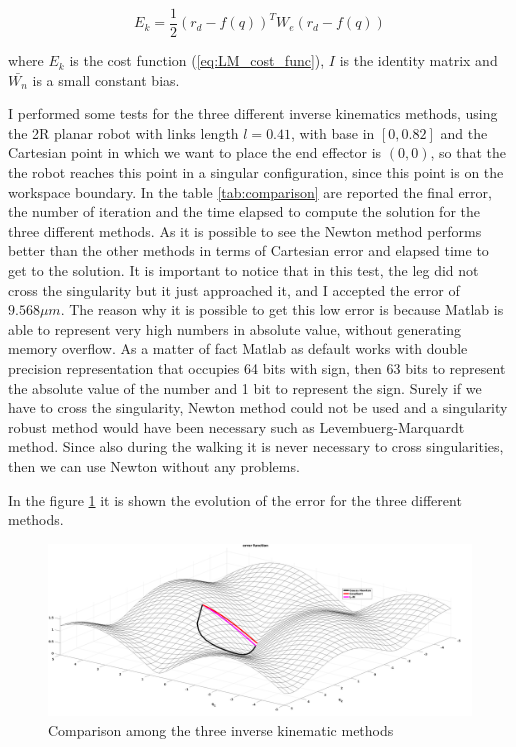 \documentclass[a4paper]{article}
\begin{document}
\begin{equation}
E_k = \frac{1}{2}(r_d-f(q))^TW_e(r_d-f(q))
\label{eq:LM_cost_func}
\end{equation}

where $E_k$ is the cost function (\ref{eq:LM_cost_func}), $I$ is the identity matrix and $\bar{W_n}$ is a small constant bias.

I performed some tests for the three different inverse kinematics methods, using the 2R planar robot with links length $l=0.41$, with base in $[0,0.82]$ and the Cartesian point in which we want to place the end effector is $(0,0)$, so that the the robot reaches this point in a singular configuration, since this point is on the workspace boundary. In the table \ref{tab:comparison} are reported the final error, the number of iteration and the time elapsed to compute the solution for the three different methods. As it is possible to see the Newton method 
performs better than the other methods in terms of Cartesian error 
and elapsed time to get to the solution. It is important to notice that in 
this test, the leg did not cross the singularity but it just approached it, 
and I accepted the error of $9.568 \mu m$. The reason why it is possible to  get 
this low error is because Matlab is able to represent very high numbers in absolute 
value, without generating memory overflow. As a matter of fact Matlab as default works with double 
precision representation that occupies 64 bits with sign, then 63 bits to represent 
the absolute value of the number and 1 bit to represent the sign. Surely if we have to cross 
the singularity, Newton method could not be used and a singularity robust method would 
have been necessary such as Levembuerg-Marquardt method. Since also during the walking 
it is never necessary to cross singularities, then we can use Newton without any problems. 



In the figure \ref{fig:comparison_IK_methodsS} it is shown the evolution of the error for the three different methods.

\begin{figure}
\center
\includegraphics[scale=0.14]{plot/kinematic/error_functin.pdf} 
\caption{Comparison among the three inverse kinematic methods} 
\label{fig:comparison_IK_methodsS}
\end{figure}
\end{document}
